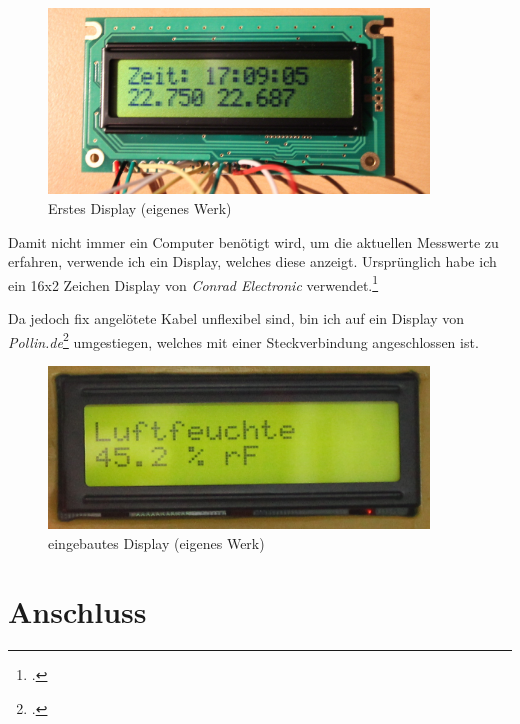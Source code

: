 \begin{figure}[h]
  \centering
     \includegraphics[width=0.9\textwidth]{figures/erstes_display.jpg}
  \caption{Erstes Display (eigenes Werk)}
  \label{fig:erstes_display}
\end{figure}

Damit nicht immer ein Computer benötigt wird, um die aktuellen Messwerte zu erfahren, verwende ich ein Display, welches diese anzeigt. Ursprünglich habe ich ein 16x2 Zeichen Display von \emph{Conrad Electronic} verwendet.\footcite{conrad_datenblatt}

Da jedoch fix angelötete Kabel unflexibel sind, bin ich auf ein Display von \emph{Pollin.de}\footcite{display_pollin} umgestiegen, welches mit einer Steckverbindung angeschlossen ist.


\begin{figure}[h]
  \centering
     \includegraphics[width=0.9\textwidth]{figures/display.jpg}
  \caption{eingebautes Display (eigenes Werk)}
  \label{fig:display}
\end{figure}

\section{Anschluss}
\label{sec:Anschluss}
